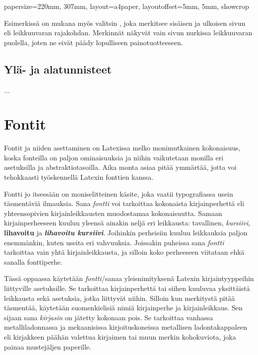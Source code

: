 \begin{koodilohkosis}
  papersize={220mm, 307mm},
  layout=a4paper,           %
  layoutoffset={5mm, 5mm},
  showcrop
\end{koodilohkosis}

Esimerkissä on mukana myös valitsin , joka merkitsee
sisäisen ja ulkoisen sivun eli leikkuuvaran rajakohdan. Merkinnät
näkyvät vain sivun nurkissa leikkuuvaran puolella, joten ne eivät päädy
lopulliseen painotuotteeseen.

\subsection{Ylä- ja alatunnisteet}
\label{luku:yla_ala_tunnisteet}



...

\section{Fontit}
\label{luku:kirjaintyypit}

Fontit ja niiden asettaminen on Latexissa melko monimutkainen
kokonaisuus, koska fonteilla on paljon ominaisuuksia ja niihin
vaikutetaan monilla eri asetuksilla ja abstraktiotasoilla. Aika monta
asiaa pitää ymmärtää, jotta voi tehokkaasti työskennellä Latexin
fonttien kanssa.

Fontti jo itsessään on moniselitteinen käsite, joka vaatii typografiassa
usein täsmentäviä ilmauksia. Sana \emph{fontti} voi tarkoittaa
kokonaista kirjainperhettä eli yhteensopivien kirjainleikkausten
muodostamaa kokonaisuutta. Samaan kirjainperheeseen kuuluu yleensä
ainakin neljä eri leikkausta: tavallinen, \textit{kursiivi},
\textbf{lihavoitu} ja \textbf{\textit{lihavoitu kursiivi}}. Joihinkin
perheisiin kuuluu leikkauksia paljon enemmänkin, kuten useita eri
vahvuuksia. Joissakin puheissa sana \emph{fontti} tarkoittaa vain yhtä
kirjainleikkausta, ja silloin koko perheeseen viitataan ehkä sanalla
fonttiperhe.

Tässä oppaassa käytetään \emph{fontti}\-/sanaa yleisnimityksenä Latexin
kirjaintyyppeihin liittyville asetuksille. Se tarkoittaa kirjainperhettä
tai siihen kuuluvaa yksittäistä leikkausta sekä asetuksia, jotka
liittyvät niihin. Silloin kun merkitystä pitää täsmentää, käytetään
suomenkielisiä nimiä kirjainperhe ja kirjainleikkaus. Sen sijaan sana
\emph{kirjasin} on jätetty kokonaan pois. Se tarkoittaa vanhassa
metalliladonnassa ja mekaanisissa kirjoituskoneissa metallisen
ladontakappaleen eli kirjakkeen päähän valettua kirjaimen tai muun
merkin kohokuviota, joka painaa mustejäljen paperille.


